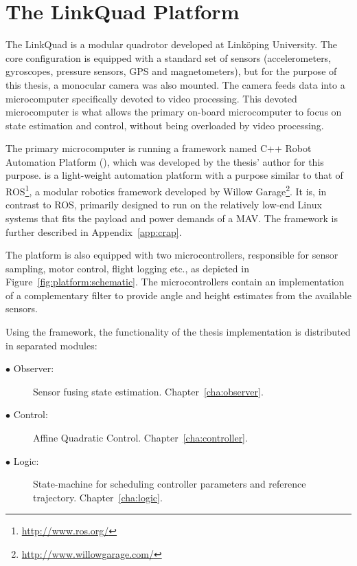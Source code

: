 \section{The LinkQuad Platform}
    The LinkQuad is a modular quadrotor developed at Linköping University.
    The core configuration is equipped with a standard set of sensors
    (accelerometers, gyroscopes, pressure sensors, GPS and magnetometers),
    but for the purpose of this thesis, a monocular camera was also mounted.
    The camera feeds data into a microcomputer specifically devoted to video processing.
    This devoted microcomputer is what allows the primary on-board microcomputer
    to focus on state estimation and control, without being overloaded by
    video processing.

    The primary microcomputer is running a framework named C++ Robot Automation Platform (\crap),
    which was developed by the thesis' author for this purpose. \crap is a light-weight
    automation platform with a purpose similar to that of ROS\footnote{\url{http://www.ros.org/}}, a
    modular robotics framework developed by Willow Garage\footnote{\url{http://www.willowgarage.com/}}.
    It is, in contrast to ROS, primarily designed to run on the relatively low-end Linux systems
    that fits the payload and power demands of a MAV. The framework is further
    described in Appendix~\ref{app:crap}.

    The platform is also equipped with two microcontrollers, responsible
    for sensor sampling, motor control, flight logging etc., as depicted in
    Figure~\ref{fig:platform:schematic}. The microcontrollers contain
    an implementation of a complementary filter to provide angle and
    height estimates from the available sensors.

    Using the \crap framework, the functionality of the thesis implementation is
    distributed in separated modules:
    \begin{description}
        \item[$\bullet$ Observer:] Sensor fusing state estimation. Chapter~\ref{cha:observer}.
        \item[$\bullet$ Control:]  Affine Quadratic Control. Chapter~\ref{cha:controller}.
        \item[$\bullet$ Logic:]    State-machine for scheduling controller parameters and reference trajectory. Chapter~\ref{cha:logic}.
    \end{description}


